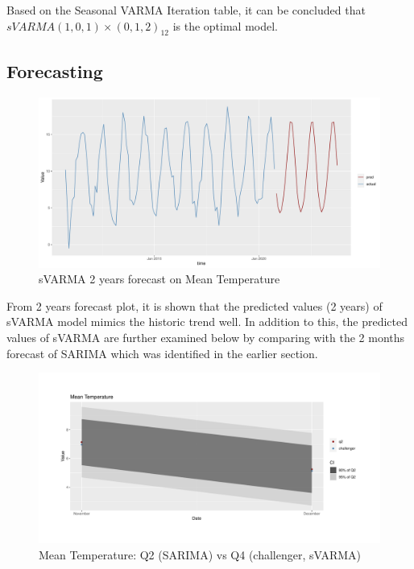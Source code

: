 \documentclass[
  11pt,
]{article}
\begin{document}
Based on the Seasonal VARMA Iteration table, it can be concluded that
\(sVARMA(1,0,1)\times(0,1,2)_{12}\) is the optimal model.

\newpage

\hypertarget{forecasting-1}{%
\subsection{Forecasting}\label{forecasting-1}}

\begin{figure}
\centering
\includegraphics{ST422_files/figure-latex/unnamed-chunk-54-1.pdf}
\caption{sVARMA 2 years forecast on Mean Temperature}
\end{figure}

From 2 years forecast plot, it is shown that the predicted values (2
years) of sVARMA model mimics the historic trend well. In addition to
this, the predicted values of sVARMA are further examined below by
comparing with the 2 months forecast of SARIMA which was identified in
the earlier section.

\newpage

\begin{figure}
\centering
\includegraphics{ST422_files/figure-latex/unnamed-chunk-55-1.pdf}
\caption{Mean Temperature: Q2 (SARIMA) vs Q4 (challenger, sVARMA)}
\end{figure}
\end{document}
